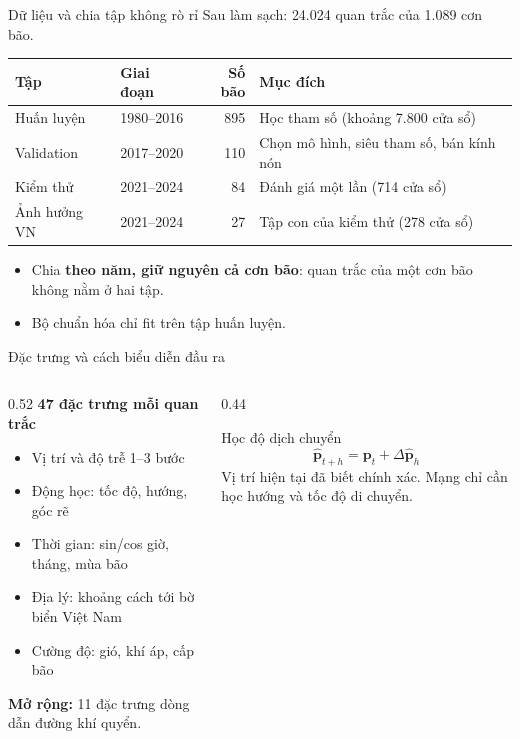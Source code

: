 \documentclass[aspectratio=169, 11pt]{beamer}
\begin{document}
\begin{frame}{Dữ liệu và chia tập không rò rỉ}
  Sau làm sạch: \alert{24.024 quan trắc của 1.089 cơn bão}.
  \vspace{0.4em}

  \centering
  \begin{tabular}{llrl}
    \toprule
    \textbf{Tập} & \textbf{Giai đoạn} & \textbf{Số bão} & \textbf{Mục đích} \\
    \midrule
    Huấn luyện   & 1980--2016 & 895 & Học tham số (khoảng 7.800 cửa sổ) \\
    Validation   & 2017--2020 & 110 & Chọn mô hình, siêu tham số, bán kính nón \\
    Kiểm thử     & 2021--2024 & 84  & Đánh giá một lần (714 cửa sổ) \\
    Ảnh hưởng VN & 2021--2024 & 27  & Tập con của kiểm thử (278 cửa sổ) \\
    \bottomrule
  \end{tabular}

  \vspace{0.6em}
  \raggedright
  \begin{itemize}
    \item Chia \textbf{theo năm, giữ nguyên cả cơn bão}: quan trắc của một cơn
          bão không nằm ở hai tập.
    \item Bộ chuẩn hóa chỉ fit trên tập huấn luyện.
  \end{itemize}
\end{frame}

\begin{frame}{Đặc trưng và cách biểu diễn đầu ra}
  \begin{columns}[T]
    \begin{column}{0.52\textwidth}
      \textbf{47 đặc trưng mỗi quan trắc}
      \begin{itemize}
        \item Vị trí và độ trễ 1--3 bước
        \item Động học: tốc độ, hướng, góc rẽ
        \item Thời gian: sin/cos giờ, tháng, mùa bão
        \item Địa lý: khoảng cách tới bờ biển Việt Nam
        \item Cường độ: gió, khí áp, cấp bão
      \end{itemize}
      \textbf{Mở rộng:} 11 đặc trưng dòng dẫn đường khí quyển.
    \end{column}
    \begin{column}{0.44\textwidth}
      \begin{block}{Học độ dịch chuyển}
        \[
          \hat{\mathbf{p}}_{t+h} = \mathbf{p}_t + \Delta\hat{\mathbf{p}}_h
        \]
        Vị trí hiện tại đã biết chính xác. Mạng chỉ cần học hướng và tốc độ
        di chuyển.
      \end{block}
    \end{column}
  \end{columns}
\end{frame}
\end{document}
